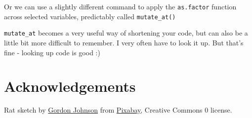 \documentclass[
]{book}
\newenvironment{Shaded}{\begin{snugshade}}{\end{snugshade}}
\newcommand{\DataTypeTok}[1]{\textcolor[rgb]{0.13,0.29,0.53}{#1}}
\newcommand{\KeywordTok}[1]{\textcolor[rgb]{0.13,0.29,0.53}{\textbf{#1}}}
\newcommand{\NormalTok}[1]{#1}
\newcommand{\OperatorTok}[1]{\textcolor[rgb]{0.81,0.36,0.00}{\textbf{#1}}}
\newcommand{\StringTok}[1]{\textcolor[rgb]{0.31,0.60,0.02}{#1}}
\begin{document}
Or we can use a slightly different command to apply the \texttt{as.factor} function across selected variables, predictably called \texttt{mutate\_at()}

\begin{Shaded}
\end{Shaded}

\texttt{mutate\_at} becomes a very useful way of shortening your code, but can also be a little bit more difficult to remember. I very often have to look it up. But that's fine - looking up code is good :)

\hypertarget{acks}{%
\chapter{Acknowledgements}\label{acks}}

Rat sketch by \href{https://pixabay.com/users/GDJ-1086657/?utm_source=link-attribution\&utm_medium=referral\&utm_campaign=image\&utm_content=5139264}{Gordon Johnson} from \href{https://pixabay.com/?utm_source=link-attribution\&utm_medium=referral\&utm_campaign=image\&utm_content=5139264}{Pixabay}, Creative Commons 0 license.
\end{document}
